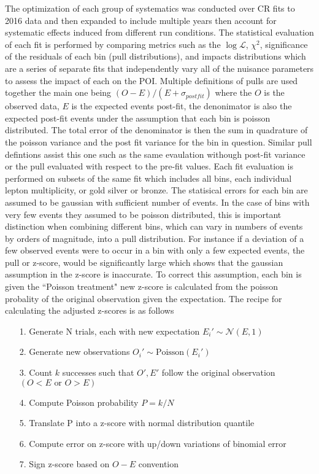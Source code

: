 The optimization of each group of systematics was conducted over CR fits to 2016 data and then expanded to include multiple years then account for systematic effects induced from different run conditions. The statistical evaluation of each fit is performed by comparing metrics such as the $\log\mathcal{L}$, $\chi^2$, significance of the residuals of each bin (pull distributions), and impacts distributions which are a series of separate fits that independently vary all of the nuisance parameters to assess the impact of each on the POI. Multiple definitions of pulls are used together the main one being $ (O-E)/(E+\sigma_{postfit})$ where the $O$ is the observed data, $E$ is the expected events post-fit, the denonimator is also the expected post-fit events under the assumption that each bin is poisson distributed. The total error of the denominator is then the sum in quadrature of the poisson variance and the post fit variance for the bin in question. Similar pull defintions assist this one such as the same evaulation withough post-fit variance or the pull evaluated with respect to the pre-fit values. Each fit evaluation is performed on subsets of the same fit which includes all bins, each individual lepton multiplicity, or gold silver or bronze. The statisical errors for each bin are assumed to be gaussian with sufficient number of events. In the case of bins with very few events they assumed to be poisson distributed, this is important distinction when combining different bins, which can vary in numbers of events by orders of magnitude, into a pull distribution. For instance if a deviation of a few observed events were to occur in a bin with only a few expected events, the pull or z-score, would be significantly large which shows that the gaussian assumption in the z-score is inaccurate. To correct this assumption, each bin is given the ``Poisson treatment" new z-score is calculated from the poisson probality of the original observation given the expectation. The recipe for calculating the adjusted z-scores is as follows
\begin{itemize}
\item[1.] Generate N trials, each with new expectation $E_i' \sim \mathcal{N}(E,1)$
\item[2.] Generate new observations $O_i'\sim \text{Poisson}(E_i')$
\item[3.] Count $k$ successes such that $O',E'$ follow the original observation $(O<E \,\, \text{or} \, \, O>E)$
\item[4.] Compute Poisson probability $P=k/N$ 
\item[5.] Translate P into a z-score with normal distribution quantile
\item[6.] Compute error on z-score with up/down variations of binomial error
\item[7.] Sign z-score based on $O-E$ convention
\end{itemize} 

